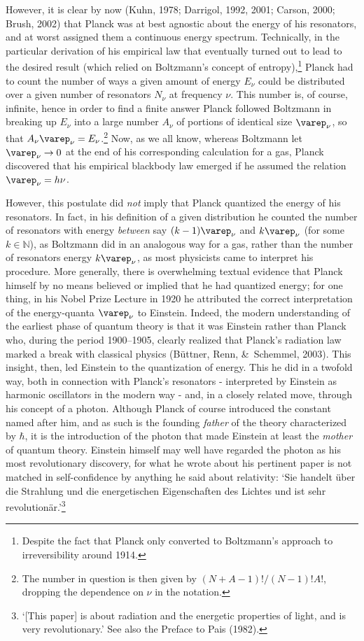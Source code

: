 \documentclass[12pt,titlepage]{article}
\newcommand{\raw}{\rightarrow} \newcommand{\rat}{\mapsto}
\begin{document}
However, it is clear by now (Kuhn, 1978; Darrigol, 1992, 2001; Carson, 2000; Brush, 2002) that Planck was at best agnostic about the energy of his resonators, and at worst assigned them a continuous energy spectrum. Technically, in the particular derivation of his empirical law that eventually turned out to lead to the desired result (which relied on Boltzmann's concept of entropy),\footnote{Despite the fact that Planck only converted to Boltzmann's approach to irreversibility around 1914.} Planck had to count the number of ways a given amount of energy $E_{\nu}$ could be distributed over a given number of resonators $N_{\nu}$ at frequency $\nu$. This number is, of course, infinite, hence in order to find a finite answer Planck followed Boltzmann in breaking up $E_{\nu}$ into a large number $A_{\nu}$ of portions of identical size $\varep_{\nu}$, so that $A_{\nu}\varep_{\nu}=E_{\nu}$.\footnote{The number in question is then given by $(N+A-1)!/(N-1)!A!$, dropping the dependence on $\nu$ in the notation.}  Now, as we all know, whereas Boltzmann let
$\varep_{\nu}\raw 0$ at the end of his corresponding calculation for a gas, Planck discovered that his empirical blackbody law emerged if he assumed the relation $\varep_{\nu}=h\nu$.

 However, this postulate did \textit{not} imply that Planck quantized the energy of his resonators. In fact, in his definition of a given distribution he counted the number of resonators with energy \textit{between} say $(k-1)\varep_{\nu}$ and
$k\varep_{\nu}$ (for some $k\in\mathbb{N}$), as Boltzmann did in an analogous way for a gas, rather than the number of resonators  energy $k\varep_{\nu}$, as most physicists came to interpret his procedure. More generally, there is overwhelming textual evidence that Planck himself by no means believed or implied that he had quantized energy; for one thing, in his Nobel Prize Lecture in 1920 he attributed the correct interpretation of the energy-quanta $\varep_{\nu}$ to Einstein. 
Indeed, the modern understanding of the earliest phase of quantum theory is that it was Einstein rather than Planck who, during the period 1900--1905, clearly realized that Planck's radiation law marked a break with classical physics  (B\"{u}ttner, Renn,  \&\ Schemmel, 2003). This insight, then,  led Einstein to  the quantization of energy. This he did in a  twofold way,  both in connection with Planck's resonators - interpreted by Einstein as harmonic oscillators in the modern way - and, in a closely related move, through his concept of a photon.  Although Planck of course introduced the constant named after him, and as such is the founding {\it father} of the theory  characterized by $\hbar$, it is the introduction of the photon that  made Einstein at least the {\it mother} of quantum theory. Einstein himself may well  have regarded the photon as his
  most revolutionary discovery, for what he wrote about his  pertinent paper is not matched in self-confidence by anything he said about relativity:  
 `Sie handelt \"{u}ber die Strahlung und die energetischen Eigenschaften des Lichtes und ist sehr revolution\"{a}r.'\footnote{`[This paper] is about radiation and the energetic properties of light, and is very revolutionary.'  See also the Preface to Pais (1982).} 
\end{document}

